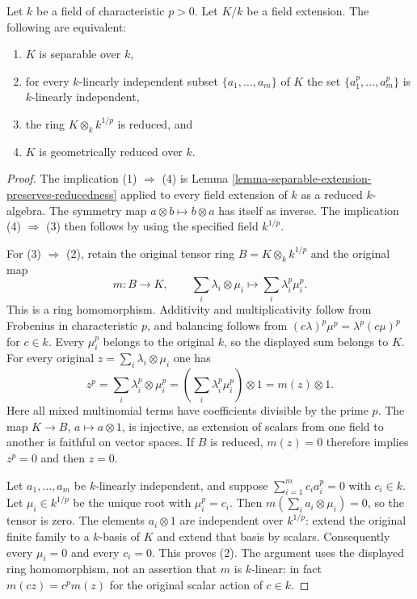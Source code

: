 \begin{lemma}
\label{lemma-characterize-separable-field-extensions}
Let $k$ be a field of characteristic $p > 0$.
Let $K/k$ be a field extension.
The following are equivalent:
\begin{enumerate}
\item $K$ is separable over $k$,
\item for every $k$-linearly independent subset $\{a_1, \ldots, a_m\}$
of $K$ the set $\{a^p_1, \ldots, a_m^p\}$ is $k$-linearly independent,
\item the ring $K \otimes_k k^{1/p}$ is reduced, and
\item $K$ is geometrically reduced over $k$.
\end{enumerate}
\end{lemma}

\begin{proof}
The implication (1) $\Rightarrow$ (4) is Lemma
\ref{lemma-separable-extension-preserves-reducedness}
applied to every field extension of $k$ as a reduced
$k$-algebra. The symmetry map $a\otimes b\mapsto b\otimes a$
has itself as inverse. The implication (4) $\Rightarrow$ (3)
then follows by using the specified field $k^{1/p}$.

For (3) $\Rightarrow$ (2), retain the original tensor
ring $B=K\otimes_k k^{1/p}$ and the original map
$$
m:B\longrightarrow K,\qquad
\sum_i\lambda_i\otimes\mu_i\longmapsto
\sum_i\lambda_i^p\mu_i^p.
$$
This is a ring homomorphism. Additivity and multiplicativity
follow from Frobenius in characteristic $p$, and balancing
follows from
$(c\lambda)^p\mu^p=\lambda^p(c\mu)^p$ for $c\in k$.
Every $\mu_i^p$ belongs to the original $k$, so the
displayed sum belongs to $K$. For every original
$z=\sum_i\lambda_i\otimes\mu_i$ one has
$$
z^p=\sum_i\lambda_i^p\otimes\mu_i^p
=\left(\sum_i\lambda_i^p\mu_i^p\right)\otimes1
=m(z)\otimes1.
$$
Here all mixed multinomial terms have coefficients
divisible by the prime $p$. The map
$K\to B$, $a\mapsto a\otimes1$, is injective, as
extension of scalars from one field to another is
faithful on vector spaces. If $B$ is reduced, $m(z)=0$
therefore implies $z^p=0$ and then $z=0$.

Let $a_1,\ldots,a_m$ be $k$-linearly independent,
and suppose $\sum_{i=1}^m c_i a_i^p=0$ with $c_i\in k$.
Let $\mu_i\in k^{1/p}$ be the unique root with
$\mu_i^p=c_i$. Then
$m(\sum_i a_i\otimes\mu_i)=0$, so the tensor is zero.
The elements $a_i\otimes1$ are independent over
$k^{1/p}$: extend the original finite family to a
$k$-basis of $K$ and extend that basis by scalars.
Consequently every $\mu_i=0$ and every $c_i=0$.
This proves (2). The argument uses the displayed
ring homomorphism, not an assertion that $m$ is
$k$-linear: in fact $m(cz)=c^p m(z)$ for the
original scalar action of $c\in k$.


\end{proof}
